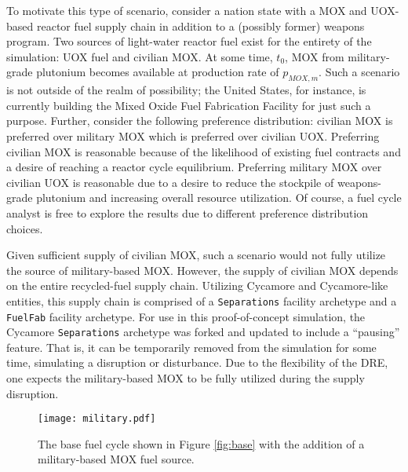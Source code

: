 To motivate this type of scenario, consider a nation state with a MOX and
UOX-based reactor fuel supply chain in addition to a (possibly former) weapons
program. Two sources of light-water reactor fuel exist for the entirety of the
simulation: UOX fuel and civilian MOX. At some time, $t_0$, MOX from
military-grade plutonium becomes available at production rate of $p_{MOX,
  m}$. Such a scenario is not outside of the realm of possibility; the United
States, for instance, is currently building the Mixed Oxide Fuel Fabrication
Facility for just such a purpose. Further, consider the following preference
distribution: civilian MOX is preferred over military MOX which is preferred
over civilian UOX. Preferring civilian MOX is reasonable because of the
likelihood of existing fuel contracts and a desire of reaching a reactor cycle
equilibrium. Preferring military MOX over civilian UOX is reasonable due to a
desire to reduce the stockpile of weapons-grade plutonium and increasing overall
resource utilization. Of course, a fuel cycle analyst is free to explore the
results due to different preference distribution choices.

Given sufficient supply of civilian MOX, such a scenario would not fully utilize
the source of military-based MOX. However, the supply of civilian MOX depends on
the entire recycled-fuel supply chain. Utilizing Cycamore and Cycamore-like
entities, this supply chain is comprised of a \texttt{Separations} facility
archetype and a \texttt{FuelFab} facility archetype. For use in this
proof-of-concept simulation, the Cycamore \texttt{Separations} archetype was
forked and updated to include a ``pausing'' feature. That is, it can be
temporarily removed from the simulation for some time, simulating a disruption
or disturbance. Due to the flexibility of the DRE, one expects the
military-based MOX to be fully utilized during the supply disruption.



\begin{figure}
  \begin{center}
    \texttt{[image: military.pdf]}
    \caption[]{
      \label{fig:military}
      The base fuel cycle shown in Figure \ref{fig:base} with the addition of a
      military-based MOX fuel source.}
  \end{center}
\end{figure}


